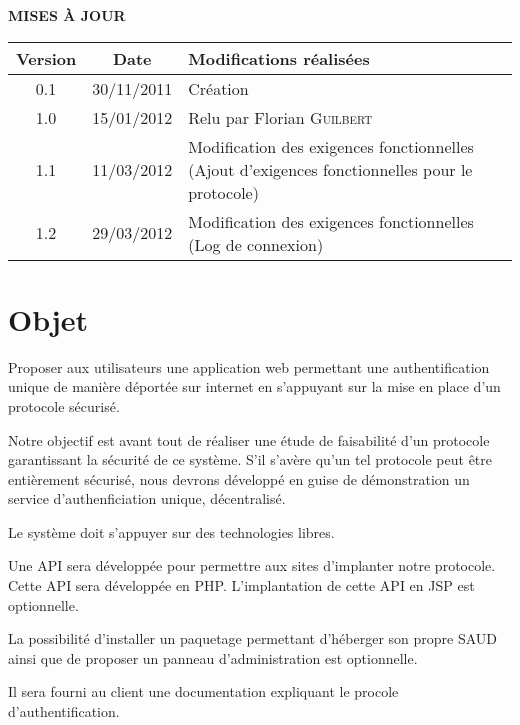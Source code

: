 \documentclass[a4paper,11pt,french]{article}
\begin{document}
\makeFirstPage
\clearpage
\vspace*{1cm}
\begin{center}
\textbf{\huge{MISES À JOUR}}\\
\vspace*{3cm}
	\begin{tabularx}{16cm}{|c|c|X|}
	\hline
	\bfseries{Version} & \bfseries{Date} & \bfseries{Modifications réalisées}\\
	\hline
	0.1 & 30/11/2011 & Création\\
	\hline
	1.0 &  15/01/2012 & Relu par Florian \textsc{Guilbert} \\
	\hline
	1.1 &  11/03/2012 & Modification des exigences fonctionnelles (Ajout
d'exigences fonctionnelles pour le protocole)\\
	\hline
	1.2 &  29/03/2012 & Modification des exigences fonctionnelles (Log de
connexion) \\
	\hline
	\end{tabularx}
\end{center}

\clearpage
\tableofcontents
\clearpage


\section{Objet}
\renewcommand\labelitemi{\textbullet} %
\renewcommand\labelitemii{$\circ$} %
Proposer aux utilisateurs une application web permettant une authentification
unique de manière déportée sur internet en s'appuyant sur la mise en
place d'un protocole sécurisé.

Notre objectif est avant tout de réaliser une étude de faisabilité d'un
protocole garantissant la sécurité de ce système. S'il s'avère qu'un tel
protocole peut être entièrement sécurisé, nous devrons développé en guise de
démonstration un service d'authenficiation unique, décentralisé.

Le système doit s'appuyer sur des technologies libres.

Une API sera développée pour permettre aux sites d'implanter notre protocole. 
Cette API sera développée en PHP. L'implantation de cette API en JSP est 
optionnelle.

La possibilité d'installer un paquetage permettant d'héberger son propre SAUD 
ainsi que de proposer un panneau d'administration est optionnelle.

Il sera fourni au client une documentation expliquant le procole 
d'authentification.
\end{document}
